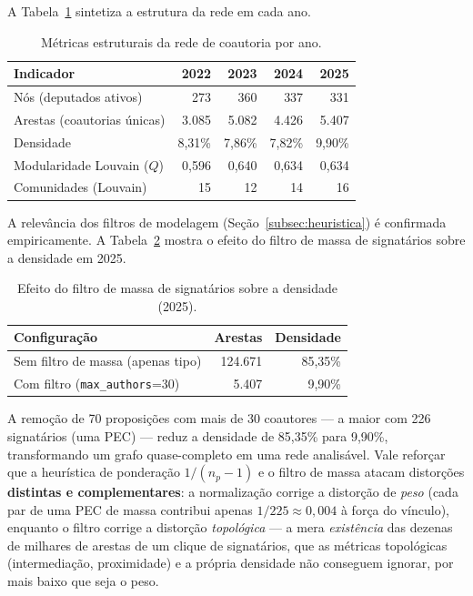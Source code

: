 \documentclass[
      12pt,
      a4paper,
      openright,
      oneside,
      chapter=TITLE,
      section=TITLE,
      english,
      french,
      spanish,
      brazilian
    ]{abntex2}
\begin{document}
    A Tabela~\ref{tab:metricas_rede} sintetiza a estrutura da rede em cada ano.
    
    \begin{table}[H]
    \centering
    \caption{Métricas estruturais da rede de coautoria por ano.}
    \label{tab:metricas_rede}
    \begin{tabular}{lrrrr}
    \toprule
    \textbf{Indicador} & \textbf{2022} & \textbf{2023} & \textbf{2024} & \textbf{2025} \\
    \midrule
    Nós (deputados ativos)       & 273   & 360   & 337   & 331   \\
    Arestas (coautorias únicas)  & 3.085 & 5.082 & 4.426 & 5.407 \\
    Densidade                    & 8,31\% & 7,86\% & 7,82\% & 9,90\% \\
    Modularidade Louvain ($Q$)   & 0,596 & 0,640 & 0,634 & 0,634 \\
    Comunidades (Louvain)        & 15    & 12    & 14    & 16    \\
    \bottomrule
    \end{tabular}
    \end{table}
    
    A relevância dos filtros de modelagem (Seção~\ref{subsec:heuristica}) é confirmada empiricamente. A Tabela~\ref{tab:filtros} mostra o efeito do filtro de massa de signatários sobre a densidade em 2025.
    
    \begin{table}[H]
    \centering
    \caption{Efeito do filtro de massa de signatários sobre a densidade (2025).}
    \label{tab:filtros}
    \begin{tabular}{lrr}
    \toprule
    \textbf{Configuração} & \textbf{Arestas} & \textbf{Densidade} \\
    \midrule
    Sem filtro de massa (apenas tipo)      & 124.671 & 85,35\% \\
    Com filtro (\texttt{max\_authors}=30)  & 5.407   & 9,90\%  \\
    \bottomrule
    \end{tabular}
    \end{table}
    
    A remoção de 70 proposições com mais de 30 coautores --- a maior com 226 signatários (uma PEC) --- reduz a densidade de 85,35\% para 9,90\%, transformando um grafo quase-completo em uma rede analisável. Vale reforçar que a heurística de ponderação $1/(n_p-1)$ e o filtro de massa atacam distorções \textbf{distintas e complementares}: a normalização corrige a distorção de \emph{peso} (cada par de uma PEC de massa contribui apenas $1/225 \approx 0{,}004$ à força do vínculo), enquanto o filtro corrige a distorção \emph{topológica} --- a mera \emph{existência} das dezenas de milhares de arestas de um clique de signatários, que as métricas topológicas (intermediação, proximidade) e a própria densidade não conseguem ignorar, por mais baixo que seja o peso.
    
\end{document}
